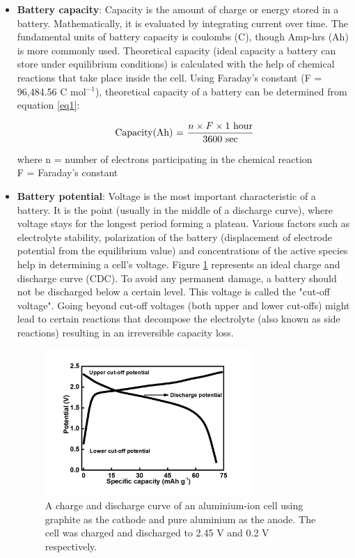 \begin{itemize}
\item \textbf{Battery capacity}: Capacity is the amount of charge or energy stored in a battery. Mathematically, it is evaluated by integrating current over time. The fundamental units of battery capacity is coulombs (C), though Amp-hrs (Ah) is more commonly used.  Theoretical capacity (ideal capacity a battery can store under equilibrium conditions) is calculated with the help of chemical reactions that take place inside the cell. Using Faraday's constant (F = 96,484.56 C mol$^{-1}$), theoretical capacity of a battery can be determined from equation \ref{eq1}:

\begin{equation} \label{eq1}
  \text{Capacity(Ah) = } \frac{n \times F \times 1 \text{ hour}}{3600 \text{ sec}}\\
\end{equation}

where n = number of electrons participating in the chemical reaction \\
F = Faraday's constant\\
\item \textbf{Battery potential}: Voltage is the  most important characteristic of a battery. It is the point (usually in the middle of a discharge curve), where voltage stays for the longest period forming a plateau. Various factors such as electrolyte stability, polarization of the battery (displacement of electrode potential from the equilibrium value) and concentrations of the active species help in determining a cell's voltage. Figure \ref{Figures/chap1fig:CDCforcellvoltage} represents an ideal charge and discharge curve (CDC). To avoid any permanent damage, a battery should not be discharged below a certain level. This voltage is called the "cut-off voltage". Going beyond cut-off voltages (both upper and lower cut-offs) might lead to certain reactions that decompose the electrolyte (also known as side reactions) resulting in an irreversible capacity loss. 

\begin{figure}[tbh!]
\centering
\includegraphics[width=0.75\textwidth]{Figures/chap1fig/CDCforcellvoltage}
\caption{A charge and discharge curve of an aluminium-ion cell using graphite as the cathode and pure aluminium as the anode. The cell was charged and discharged to 2.45 V and 0.2 V respectively.}
\label{Figures/chap1fig:CDCforcellvoltage}
\end{figure}


\end{itemize}
